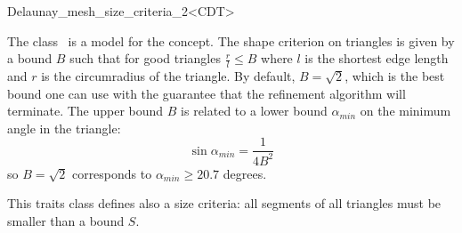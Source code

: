 \begin{ccRefClass}{Delaunay_mesh_size_criteria_2<CDT>}

\ccDefinition
  
The class \ccRefName\ is a model for the  concept.
The shape criterion on triangles is given by a bound $B$ such that for good
triangles $\frac{r}{l} \le B$ where $l$ is the shortest edge length
and $r$ is the circumradius of the triangle.  By default, $B=\sqrt{2}$,
which is the best bound one can use with the guarantee that the refinement
algorithm will terminate. The upper bound $B$ is related to a lower bound
$\alpha_{min}$ on the minimum angle in the triangle:
\begin{displaymath}
  \sin{ \alpha_{min} } = \frac{1}{4 B^2}
\end{displaymath}
so $B=\sqrt{2}$ corresponds to  $\alpha_{min} \ge 20.7$ degrees.

This traits class defines also a size criteria: all segments of all
triangles must be smaller than a bound $S$.


\ccIsModel


\ccCreation
{}

\end{ccRefClass}

